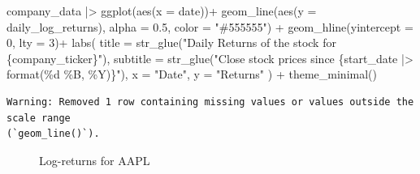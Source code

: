 \documentclass[
  letterpaper,
  DIV=11,
  numbers=noendperiod]{scrreprt}
\newenvironment{Shaded}{\begin{snugshade}}{\end{snugshade}}
\newcommand{\AttributeTok}[1]{\textcolor[rgb]{0.40,0.45,0.13}{#1}}
\newcommand{\DecValTok}[1]{\textcolor[rgb]{0.68,0.00,0.00}{#1}}
\newcommand{\FloatTok}[1]{\textcolor[rgb]{0.68,0.00,0.00}{#1}}
\newcommand{\FunctionTok}[1]{\textcolor[rgb]{0.28,0.35,0.67}{#1}}
\newcommand{\NormalTok}[1]{\textcolor[rgb]{0.00,0.23,0.31}{#1}}
\newcommand{\SpecialCharTok}[1]{\textcolor[rgb]{0.37,0.37,0.37}{#1}}
\newcommand{\StringTok}[1]{\textcolor[rgb]{0.13,0.47,0.30}{#1}}
\theoremstyle{definition}
\theoremstyle{remark}
\begin{document}
\begin{Shaded}
\begin{Highlighting}[]
\NormalTok{company\_data }\SpecialCharTok{|\textgreater{}} 
  \FunctionTok{ggplot}\NormalTok{(}\FunctionTok{aes}\NormalTok{(}\AttributeTok{x =}\NormalTok{ date))}\SpecialCharTok{+}
  \FunctionTok{geom\_line}\NormalTok{(}\FunctionTok{aes}\NormalTok{(}\AttributeTok{y =}\NormalTok{ daily\_log\_returns), }\AttributeTok{alpha =} \FloatTok{0.5}\NormalTok{, }\AttributeTok{color =} \StringTok{"\#555555"}\NormalTok{) }\SpecialCharTok{+}
  \FunctionTok{geom\_hline}\NormalTok{(}\AttributeTok{yintercept =} \DecValTok{0}\NormalTok{, }\AttributeTok{lty =} \DecValTok{3}\NormalTok{)}\SpecialCharTok{+}
  \FunctionTok{labs}\NormalTok{(}
    \AttributeTok{title =} \FunctionTok{str\_glue}\NormalTok{(}\StringTok{"Daily Returns of the stock for \{company\_ticker\}"}\NormalTok{), }
    \AttributeTok{subtitle =} \FunctionTok{str\_glue}\NormalTok{(}\StringTok{"Close stock prices since \{start\_date |\textgreater{} format(\textquotesingle{}\%d \%B, \%Y\textquotesingle{})\}"}\NormalTok{),}
    \AttributeTok{x =} \StringTok{"Date"}\NormalTok{,}
    \AttributeTok{y =} \StringTok{"Returns"}
\NormalTok{    ) }\SpecialCharTok{+} 
  \FunctionTok{theme\_minimal}\NormalTok{()}
\end{Highlighting}
\end{Shaded}

\begin{verbatim}
Warning: Removed 1 row containing missing values or values outside the scale range
(`geom_line()`).
\end{verbatim}

\begin{figure}[H]


\caption{\label{fig-log-returns-aapl}Log-returns for AAPL}

\end{figure}%
\end{document}
